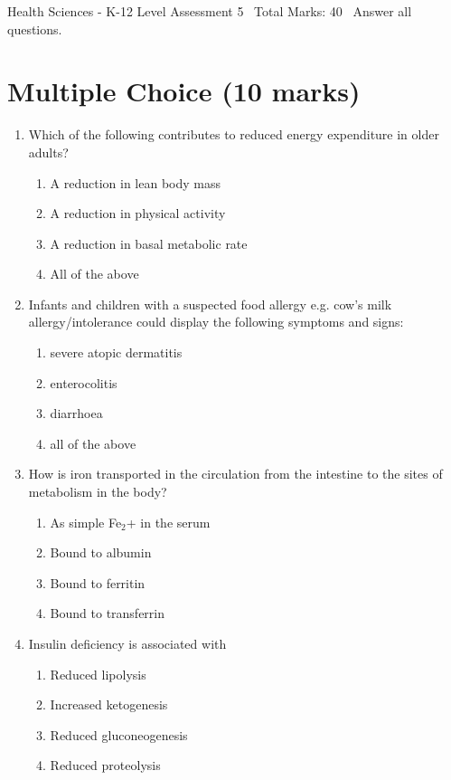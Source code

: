 \documentclass[12pt]{article}
\begin{document}
\begin{center}
Health Sciences - K-12 Level Assessment 5 \
Total Marks: 40 \
Answer all questions.
\end{center}

\section*{Multiple Choice (10 marks)}
\begin{enumerate}[label=\arabic*.]
\item Which of the following contributes to reduced energy expenditure in older adults?
\begin{enumerate}[label=(\alph*)]
    \item A reduction in lean body mass
    \item A reduction in physical activity
    \item A reduction in basal metabolic rate
    \item All of the above
\end{enumerate}
\item Infants and children with a suspected food allergy e.g. cow's milk allergy/intolerance could display the following symptoms and signs:
\begin{enumerate}[label=(\alph*)]
    \item severe atopic dermatitis
    \item enterocolitis
    \item diarrhoea
    \item all of the above
\end{enumerate}
\item How is iron transported in the circulation from the intestine to the sites of metabolism in the body?
\begin{enumerate}[label=(\alph*)]
    \item As simple Fe$_{2}$+ in the serum
    \item Bound to albumin
    \item Bound to ferritin
    \item Bound to transferrin
\end{enumerate}
\item Insulin deficiency is associated with
\begin{enumerate}[label=(\alph*)]
    \item Reduced lipolysis
    \item Increased ketogenesis
    \item Reduced gluconeogenesis
    \item Reduced proteolysis

\end{enumerate}
\end{enumerate}
\end{document}
